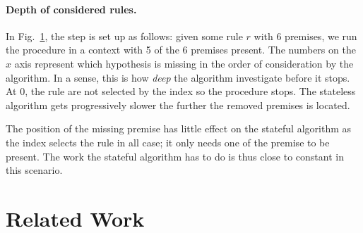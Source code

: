 \documentclass[runningheads]{llncs}
\newcommand{\xcom}[1]{{\color{cyan}{Xavier: #1}} }
\begin{document}
\paragraph{Depth of considered rules.}

\begin{figure}
    \label{fig:erase}
    \end{figure}

In Fig.~\ref{fig:erase}, the step is set up as follows: given some rule $r$ with $6$ \xcom{motivate 6} premises, we run the procedure in a context with 5 of the 6 premises present.
The numbers on the $x$ axis represent which hypothesis is missing in the order of consideration by the algorithm.
In a sense, this is how \textit{deep} the algorithm investigate before it stops.
At $0$, the rule are not selected by the index so the procedure stops.
The stateless algorithm gets progressively slower the further the removed premises is located.

The position of the missing premise has little effect on the stateful algorithm as the index selects the rule in all case; it only needs one of the premise to be present.
The work the stateful algorithm has to do is thus close to constant in this scenario.

\section{Related Work}
\end{document}
